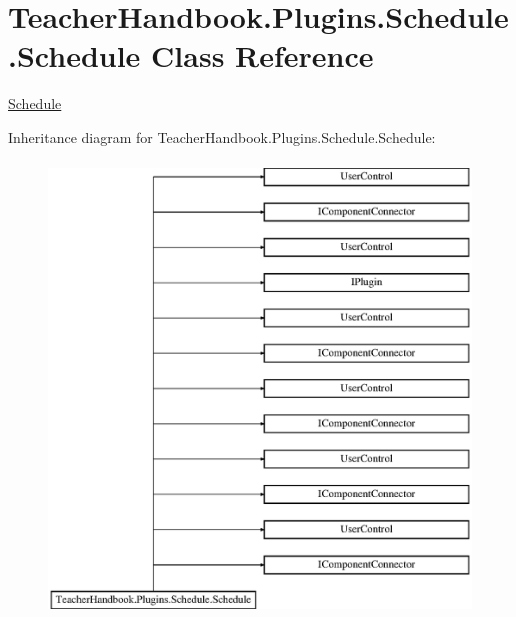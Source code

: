 \hypertarget{class_teacher_handbook_1_1_plugins_1_1_schedule_1_1_schedule}{}\section{Teacher\+Handbook.\+Plugins.\+Schedule.\+Schedule Class Reference}
\label{class_teacher_handbook_1_1_plugins_1_1_schedule_1_1_schedule}


\mbox{\hyperlink{class_teacher_handbook_1_1_plugins_1_1_schedule_1_1_schedule}{Schedule}}  


Inheritance diagram for Teacher\+Handbook.\+Plugins.\+Schedule.\+Schedule\+:\begin{figure}[H]
\begin{center}
\leavevmode
\includegraphics[height=12.000000cm]{dc/d1d/class_teacher_handbook_1_1_plugins_1_1_schedule_1_1_schedule}
\end{center}
\end{figure}
